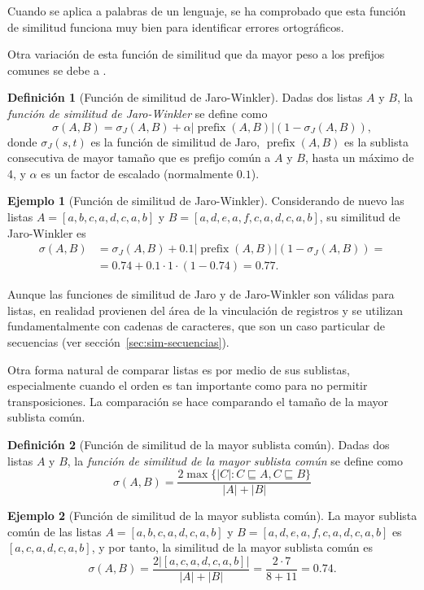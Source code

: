 \documentclass[a4paper,10pt,twoside]{article}
\theoremstyle{definition}
\newtheorem{definition}{Definición}
\newtheorem{example}{Ejemplo}
\begin{document}
Cuando se aplica a palabras de un lenguaje, se ha comprobado que esta función de similitud funciona muy bien para identificar errores ortográficos. 

Otra variación de esta función de similitud que da mayor peso a los prefijos comunes se debe a \cite{winkler1999state}.

\begin{definition}[Función de similitud de Jaro-Winkler]
Dadas dos listas $A$ y $B$, la \emph{función de similitud de Jaro-Winkler} se define como
\[
\sigma(A,B)=\sigma_J(A,B)+\alpha|\operatorname{prefix}(A,B)|(1-\sigma_J(A,B)),
\]
donde $\sigma_J(s,t)$ es la función de similitud de Jaro, $\operatorname{prefix}(A,B)$ es la sublista consecutiva de mayor tamaño que es prefijo común a $A$ y $B$, hasta un máximo de 4, y $\alpha$ es un factor de escalado (normalmente $0.1$).
\end{definition}

\begin{example}[Función de similitud de Jaro-Winkler]
Considerando de nuevo las listas $A=[a,b,c,a,d,c,a,b]$ y $B=[a,d,e,a,f,c,a,d,c,a,b]$, su similitud de Jaro-Winkler es
\begin{align*}
\sigma(A,B)&=\sigma_J(A,B)+0.1|\operatorname{prefix}(A,B)|(1-\sigma_J(A,B)) = \\
&=0.74 + 0.1\cdot 1\cdot (1-0.74) = 0.77.
\end{align*}
\end{example}

Aunque las funciones de similitud de Jaro y de Jaro-Winkler son válidas para listas, en realidad provienen del área de la vinculación de registros y se utilizan fundamentalmente con cadenas de caracteres, que son un caso particular de secuencias (ver sección~\ref{sec:sim-secuencias}).

Otra forma natural de comparar listas es por medio de sus sublistas, especialmente cuando el orden es tan importante como para no permitir transposiciones.
La comparación se hace comparando el tamaño de la mayor sublista común.

\begin{definition}[Función de similitud de la mayor sublista común]
Dadas dos listas $A$ y $B$, la \emph{función de similitud de la mayor sublista común} se define como
\[
\sigma(A,B) = \frac{2\max\{|C|:C\sqsubseteq A, C\sqsubseteq B\}}{|A|+|B|}
\]
\end{definition}

\begin{example}[Función de similitud de la mayor sublista común]
La mayor sublista común de las listas $A=[a,b,c,a,d,c,a,b]$ y $B=[a,d,e,a,f,c,a,d,c,a,b]$ es $[a,c,a,d,c,a,b]$, y por tanto, la similitud de la mayor
sublista común es
\[
\sigma(A,B) = \frac{2|[a,c,a,d,c,a,b]|}{|A|+|B|} = \frac{2\cdot 7}{8+11} = 0.74. 
\]
\end{example}
\end{document}
